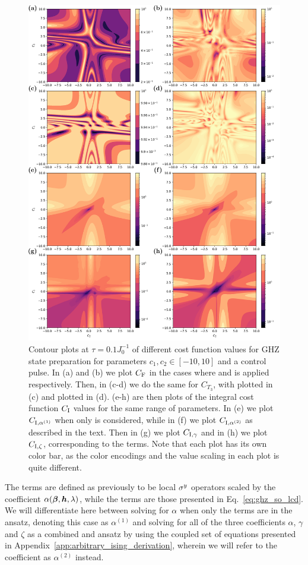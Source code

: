 \begin{figure}[t!]
    \centering
    \includegraphics[width=0.75\linewidth]{images_v1/ghz_contour_integrals.png} \caption[Contour plots of cost function landscapes for GHZ state preparation in frustrated spin systems (integral cost function).]{Contour plots at $\tau = 0.1 J_0^{-1}$ of different cost function values for GHZ state preparation for parameters $c_1, c_2 \in [-10,10]$ and a  control pulse. In (a) and (b) we plot $C_{\rm F}$ in the cases where  and   is applied respectively. Then, in (c-d) we do the same for $C_{T_3}$, with   plotted in (c) and   plotted in (d). (e-h) are then plots of the integral cost function $C_{\rm I}$ values for the same range of parameters. In (e) we plot $C_{\rm I, \alpha^{(1)}}$ when only   is considered, while in (f) we plot $C_{\rm I, \alpha^{(2)}}$ as described in the text. Then in (g) we plot $C_{\rm I, \gamma}$ and in (h) we plot $C_{\rm I, \zeta}$, corresponding to the  terms. Note that each plot has its own color bar, as the color encodings and the value scaling in each plot is quite different.}\label{fig:ghz_contours}
\end{figure}

The   terms are defined as previously to be local $\sigma^y$ operators scaled by the coefficient $\alpha(\boldsymbol{\beta}, \boldsymbol{h}, \lambda)$, while the  terms are those presented in Eq.~\eqref{eq:ghz_so_lcd}. We will differentiate here between solving for $\alpha$ when only the  terms are in the  ansatz, denoting this case as $\alpha^{(1)}$ and solving for all of the three coefficients $\alpha$, $\gamma$ and $\zeta$ as a combined  and  ansatz by using the coupled set of equations presented in Appendix~\ref{app:arbitrary_ising_derivation}, wherein we will refer to the  coefficient as $\alpha^{(2)}$ instead.

